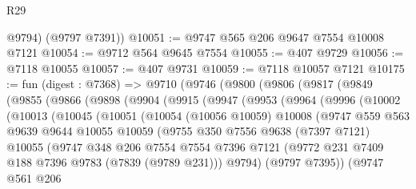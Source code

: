 \begin{lexlean}{R29}
\begin{coremodule}
        @9794)
      (@9797 @7391))
@10051 := @9747 @565 @206 @9647 @7554 @10008 @7121
@10054 := @9712 @564 @9645 @7554
@10055 := @407 @9729
@10056 := @7118 @10055
@10057 := @407 @9731
@10059 := @7118 @10057 @7121
@10175 := fun (digest : @7368) =>
  @9710
    (@9746
      (@9800
        (@9806
          (@9817
            (@9849
              (@9855
                (@9866
                  (@9898
                    (@9904
                      (@9915
                        (@9947
                          (@9953
                            (@9964
                              (@9996
                                (@10002
                                  (@10013
                                    (@10045
                                      (@10051
                                        (@10054
                                          (@10056 @10059)
                                          @10008
                                          (@9747
                                            @559
                                            @563
                                            @9639
                                            @9644
                                            @10055
                                            @10059
                                            (@9755
                                              @350
                                              @7556
                                              @9638
                                              (@7397 @7121)
                                              @10055
                                              (@9747
                                                @348
                                                @206
                                                @7554
                                                @7554
                                                @7396
                                                @7121
                                                (@9772
                                                  @231
                                                  @7409
                                                  @188
                                                  @7396
                                                  @9783
                                                  (@7839 (@9789 @231)))
                                                @9794)
                                              (@9797 @7395))
                                            (@9747
                                              @561
                                              @206

\end{coremodule}
\end{lexlean}
